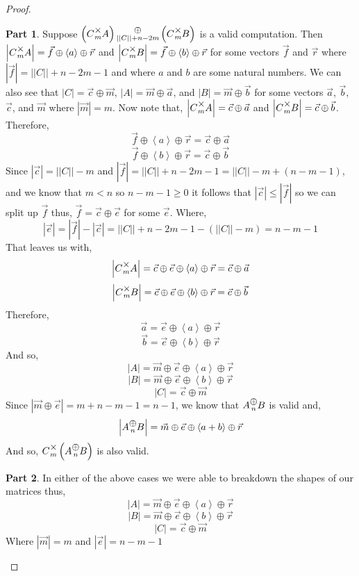\documentclass[12pt]{book}
\theoremstyle{plain}
\theoremstyle{definition}
\theoremstyle{ppart}
\newtheorem{ppart}{Part}
\theoremstyle{case}
\theoremstyle{solution}
\newcommand{\mmult}[1]{\text{\raisebox{1ex}{$\underset{#1}{\times}$}}}
\newcommand{\mconcat}[1]{\text{\raisebox{1ex}{$\underset{#1}{\oplus}$}}}
\newcommand{\shape}[1]{\left|#1\right|}
\begin{document}
\begin{landscape}
\begin{proof}
\begin{ppart}
Suppose $\left(C \mmult{m} A\right) \mconcat{\shape{\shape{C}}+n-2m} \left(C \mmult{m} B\right)$ is a valid computation.
Then $\shape{C \mmult{m} A} = \vec{f} \oplus \left<a\right> \oplus \vec{r}$ and
$\shape{C \mmult{m} B} = \vec{f} \oplus \left<b\right> \oplus \vec{r}$ for some
vectors $\vec{f}$ and $\vec{r}$ where $\shape{\vec{f}} = \shape{\shape{C}}+n-2m-1$ and where $a$ and $b$ are some natural numbers.
We can also see that $\shape{C} = \vec{c} \oplus \vec{m}$, $\shape{A} = \vec{m} \oplus \vec{a}$, and $\shape{B} = \vec{m} \oplus \vec{b}$
for some vectors $\vec{a}$, $\vec{b}$, $\vec{c}$, and $\vec{m}$ where $\shape{\vec{m}} = m$.
Now note that, $\shape{C \mmult{m} A} = \vec{c} \oplus \vec{a}$ and $\shape{C \mmult{m} B} = \vec{c} \oplus \vec{b}$.
Therefore, 
\[ \vec{f} \oplus \left<a\right> \oplus \vec{r} = \vec{c} \oplus \vec{a} \]
\[ \vec{f} \oplus \left<b\right> \oplus \vec{r} = \vec{c} \oplus \vec{b} \]
Since $\shape{\vec{c}} = \shape{\shape{C}}-m$ and 
$\shape{\vec{f}} = \shape{\shape{C}}+n-2m-1 = \shape{\shape{C}}-m+(n-m-1)$,
and we know that $m < n$ so $n-m-1 \ge 0$ it follows that $\shape{\vec{c}} \le \shape{\vec{f}}$
so we can split up $\vec{f}$ thus, $\vec{f} = \vec{c} \oplus \vec{e}$ for some $\vec{e}$.
Where,
\[ \shape{\vec{e}} = \shape{\vec{f}}-\shape{\vec{c}} = \shape{\shape{C}}+n-2m-1 - (\shape{\shape{C}}-m) = n-m-1 \]
That leaves us with,
\[ \shape{C \mmult{m} A} = \vec{c} \oplus \vec{e} \oplus \left<a\right> \oplus \vec{r} = \vec{c} \oplus \vec{a}\]
\[ \shape{C \mmult{m} B} = \vec{c} \oplus \vec{e} \oplus \left<b\right> \oplus \vec{r} = \vec{c} \oplus \vec{b}\]
Therefore,
\[ \vec{a} = \vec{e} \oplus \left<a\right> \oplus \vec{r} \]
\[ \vec{b} = \vec{e} \oplus \left<b\right> \oplus \vec{r} \]
And so,
\[ \shape{A} = \vec{m} \oplus \vec{e} \oplus \left<a\right> \oplus \vec{r} \]
\[ \shape{B} = \vec{m} \oplus \vec{e} \oplus \left<b\right> \oplus \vec{r} \]
\[ \shape{C} = \vec{c} \oplus \vec{m} \]
Since $\shape{\vec{m} \oplus \vec{e}} = m+n-m-1 = n-1$, we know that $A \mconcat{n} B$ is valid and,
\[ \shape{A \mconcat{n} B} = \vec{m} \oplus \vec{e} \oplus \left<a+b\right> \oplus \vec{r} \]
And so, $C \mmult{m} \left(A \mconcat{n} B\right)$ is also valid.
\end{ppart}

\begin{ppart}
In either of the above cases we were able to breakdown the shapes of our matrices thus,
\[ \shape{A} = \vec{m} \oplus \vec{e} \oplus \left<a\right> \oplus \vec{r} \]
\[ \shape{B} = \vec{m} \oplus \vec{e} \oplus \left<b\right> \oplus \vec{r} \]
\[ \shape{C} = \vec{c} \oplus \vec{m} \]
Where $\shape{\vec{m}} = m$ and $\shape{\vec{e}} = n-m-1$


\end{ppart}
\end{proof}
\end{landscape}
\end{document}
